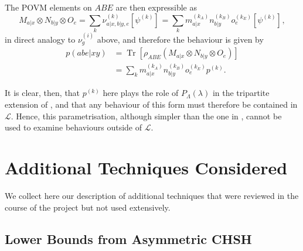 \documentclass[10pt, a4paper]{article}
\numberwithin{equation}{section} %
\theoremstyle{definition}
\theoremstyle{plain}
\newcommand{\?}{\mathrel{?}} %
\newcommand{\Tr}[2][]{\mathop{\mathrm{Tr}#1}\left[ #2 \right]} %
\newcommand{\proj}[2][]{{[#2]}_{#1}}
\newcommand{\Ls}{\mathcal{L}}
\begin{document}
\begin{appendices}
                            The POVM elements on \(ABE\) are then expressible as
                            \begin{equation}
                              M_{a|x} \otimes N_{b|y} \otimes O_e = \sum_k \nu^{(k)}_{a|x,b|y,e} \proj{\psi^{(k)}} = \sum_k m_{a|x}^{(k_A)} n_{b|y}^{(k_B)} o_e^{(k_E)} \proj{\psi^{(k)}},
                            \end{equation}
                            in direct analogy to \(\nu_{g}^{(i)}\) above, and therefore the behaviour is given by
                            \begin{align}
                              p(abe|xy) &= \Tr{\rho_{ABE} \left(M_{a|x} \otimes N_{b|y} \otimes O_e\right)} \\
                                        &= \sum_k m_{a|x}^{(k_A)} n_{b|y}^{(k_B)} o_e^{(k_E)} p^{(k)}.
                            \end{align}

                            It is clear, then, that \(p^{(k)}\) here plays the role of \(P_{\Lambda}(\lambda)\) in the tripartite extension of , and that any behaviour of this form must therefore be contained in \(\Ls\). Hence, this parametrisation, although simpler than the one in , cannot be used to examine behaviours outside of \(\Ls\).

                            \section{Additional Techniques Considered}\label{sec:addtech}

                            We collect here our description of additional techniques that were reviewed in the course of the project but not used extensively.

                            \subsection{Lower Bounds from Asymmetric CHSH}


\end{appendices}
\end{document}
